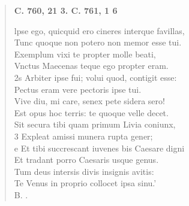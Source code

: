 \documentclass[11pt, a4paper]{report}
\begin{document}
\begin{verse}
    \begin{center} \textbf{C. 760, 21 3. C. 761, 1 6} \end{center} \marginpar{[243]} lpse ego, quicquid ero cineres interque favillas, \\ Tunc quoque non potero non memor esse tui. \\ Exemplum vixi te propter molle beati, \\ Vnctus Maecenas teque ego propter eram. \\ 2s Arbiter ipse fui; volui quod, contigit esse: \\ Pectus eram vere pectoris ipse tui. \\ Vive diu, mi care, senex pete sidera sero! \\ Est opus hoc terris: te quoque velle decet. \\ Sit secura tibi quam primum Livia coniunx, \\ 3 Expleat amissi munera rupta gener; \\ e Et tibi succrescant iuvenes bis Caesare digni \\ Et tradant porro Caesaris usque genus. \\ Tum deus intersis divis insignis avitis: \\ Te Venus in proprio collocet ipsa sinu.’ \\ B. . \\ 
      \end{verse}
  
\end{document}
